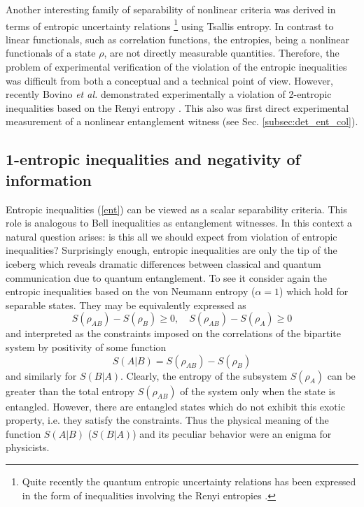\documentclass[twocolumn,aps,rmp]{revtex4}
\begin{document}
Another interesting family of separability of nonlinear criteria was
derived \cite {GuehneL2004-pra} in terms of entropic uncertainty relations
\cite{Birula,Deutsch,Kraus,MaasssenU1988}\footnote{Quite recently the
  quantum entropic uncertainty relations has been expressed in the
  form of inequalities involving the Renyi entropies
  \cite{bialynickibirula-2006-74}.} using Tsallis entropy.  In contrast
to linear functionals, such as correlation functions, the entropies,
being a nonlinear functionals of a state $\rho$, are not directly
measurable quantities. Therefore, the problem of experimental
verification of the violation of the entropic inequalities was
difficult from both a conceptual and a technical point of
view. However, recently Bovino \emph{et al.}  demonstrated
experimentally a violation of 2-entropic inequalities based on the
Renyi entropy \cite {NonlinExp}. This also was first direct
experimental measurement of a nonlinear entanglement witness (see
Sec. \ref{subsec:det_ent_col}).

\subsection {1-entropic inequalities and negativity of information}

Entropic inequalities (\ref{ent}) can be viewed as a scalar
separability criteria. This role is analogous to Bell inequalities as
entanglement witnesses. In this context a natural question arises: is
this all we should expect from violation of entropic inequalities?
Surprisingly enough, entropic inequalities are only the tip of the
iceberg which reveals dramatic differences between classical and
quantum communication due to quantum entanglement. To see it consider
again the entropic inequalities based on the von Neumann entropy
($\alpha=1$) which hold for separable states. They may be equivalently
expressed as
\begin{equation}
S(\rho_{AB}) - S(\rho _B)\geq0, \quad  S(\rho_{AB})- S(\rho _A)\geq0
\label{pur1}
\end{equation}
and interpreted as the constraints imposed on the correlations of the
bipartite system by positivity of some function
\begin{equation}
S(A|B) = S(\rho_{AB}) - S(\rho_B) \label{pur2}
\end{equation}
and similarly for $S(B|A)$. Clearly, the entropy of the subsystem
$S(\rho_A)$ can be greater than the total entropy $S(\rho_{AB})$ of
the system only when the state is entangled.  However, there are
entangled states which do not exhibit this exotic property, i.e. they
satisfy the constraints. Thus the physical meaning of the function
$S(A|B)$ ($S(B|A)$) and its peculiar behavior were an enigma for
physicists.
\end{document}
